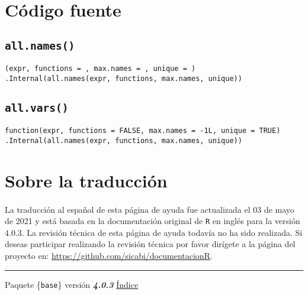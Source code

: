 \documentclass{article}[letter, 12pt]
\newlength\tindent
\renewcommand{\indent}{\hspace*{\tindent}}
\def\code#1{\texttt{#1}}
\def\codename#1{\texttt{\color{gray}\small#1}}
\begin{document}
\section{\color{gray}Código fuente}
\subsection{\color{gray} \code{all.names()}}
\indent\code{\color{red}{function}(expr, functions = \color{blue}{TRUE}, max.names = \color{blue}{-1L}, unique = \color{blue}{FALSE})} \\
\indent\indent\code{.Internal(all.names(expr, functions, max.names, unique))}\\
\subsection{\color{gray} \code{all.vars()}}
\indent\code{function(expr, functions = FALSE, max.names = -1L, unique = TRUE)} \\
\indent\indent\code{.Internal(all.names(expr, functions, max.names, unique))}\\

\section{\color{gray}Sobre la traducción}
\paragraph{}
La traducción al español de esta página de ayuda fue actualizada el 03 de mayo de 2021 y está basada en la documentación original de \codename{R} en inglés para la versión 4.0.3. La revisión técnica de esta página de ayuda todavía no ha sido realizada. Si deseas participar realizando la revisión técnica por favor dirígete a la página del proyecto en: \href{https://github.com/sicabi/documentacionR}{https://github.com/sicabi/documentacionR}.
\\
\par\noindent\rule{\textwidth}{0.4pt}
\centerline{Paquete \{\code{base}\} versión \textbf{\emph{4.0.3}} \href{run:/Vocabulary.pdf}{Índice}}
\end{document}
